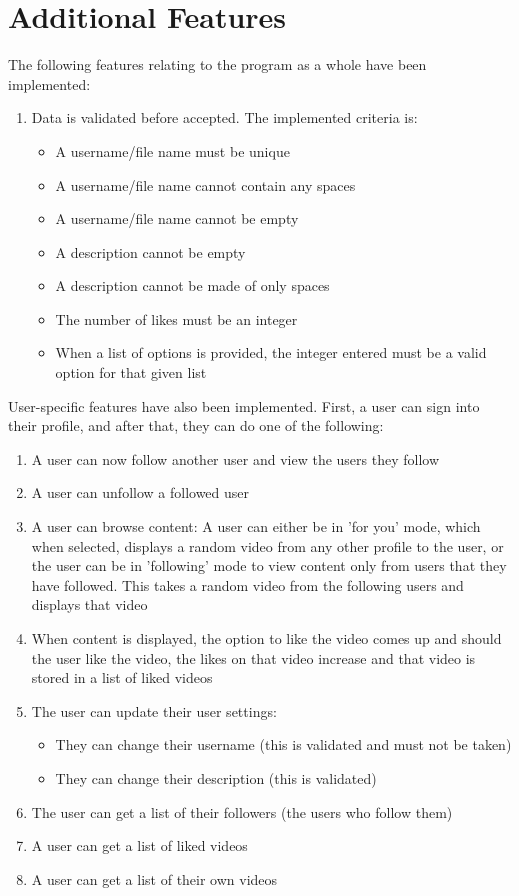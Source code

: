 \documentclass{assignment}
\begin{document}
\newpage
\section{Additional Features}
The following features relating to the program as a whole have been implemented:
\begin{enumerate}
    \item Data is validated before accepted. The implemented criteria is:
    \begin{itemize}
        \item A username/file name must be unique
        \item A username/file name cannot contain any spaces
        \item A username/file name cannot be empty
        \item A description cannot be empty
        \item A description cannot be made of only spaces
        \item The number of likes must be an integer
        \item When a list of options is provided, the integer entered must be a valid option for that given list
    \end{itemize}
\end{enumerate}
User-specific features have also been implemented. First, a user can sign into their profile, and after that, they can do one of the following:
\begin{enumerate}
    \item A user can now follow another user and view the users they follow
    \item A user can unfollow a followed user
    \item A user can browse content: A user can either be in 'for you' mode, which when selected, displays a random video from any other profile to the user, or the user can be in 'following' mode to view content only from users that they have followed. This takes a random video from the following users and displays that video
    \item When content is displayed, the option to like the video comes up and should the user like the video, the likes on that video increase and that video is stored in a list of liked videos
    \item The user can update their user settings:
        \begin{itemize}
            \item They can change their username (this is validated and must not be taken)
            \item They can change their description (this is validated)
        \end{itemize}
    \item The user can get a list of their followers (the users who follow them)
    
    \item A user can get a list of liked videos
    \item A user can get a list of their own videos
\end{enumerate}
\end{document}
